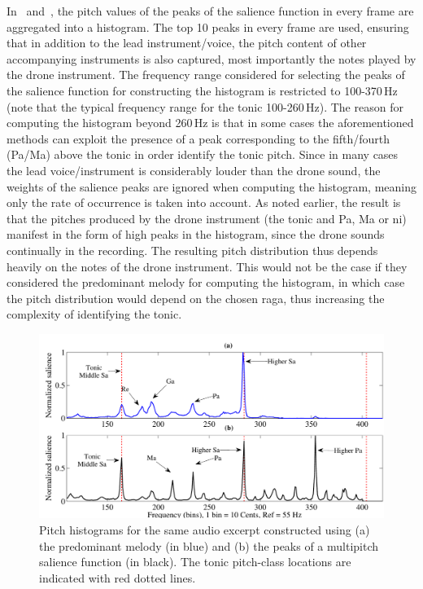 In~\cite{salamon2012multipitch} and~\cite{gulati2012two}, the pitch values of the peaks of the salience function in every frame are aggregated into a histogram. The top 10 peaks in every frame are used, ensuring that in addition to the lead instrument/voice, the pitch content of other accompanying instruments is also captured, most importantly the notes played by the drone instrument. The frequency range considered for selecting the peaks of the salience function for constructing the histogram is restricted to 100-370\,Hz (note that the typical frequency range for the tonic 100-260\,Hz). The reason for computing the histogram beyond 260\,Hz is that in some cases the aforementioned methods can exploit the presence of a peak corresponding to the fifth/fourth (Pa/Ma) above the tonic in order identify the tonic pitch. Since in many cases the lead voice/instrument is considerably louder than the drone sound, the weights of the salience peaks are ignored when computing the histogram, meaning only the rate of occurrence is taken into account. As noted earlier, the result is that the pitches produced by the drone instrument (the tonic and Pa, Ma or \gls{ni}) manifest in the form of high peaks in the histogram, since the drone sounds continually in the recording. The resulting pitch distribution thus depends heavily on the notes of the drone instrument. This would not be the case if they considered the predominant melody for computing the histogram, in which case the pitch distribution would depend on the chosen \gls{raga}, thus increasing the complexity of identifying the tonic.

\begin{figure}
	\begin{center}
		\includegraphics[width=\figSizeHundred]{ch02_background/figures/Histogram_Melody_Multipitch.pdf}
	\end{center}
	\caption[Pitch histograms constructed using two different methods]{Pitch histograms for the same audio excerpt constructed using (a) the predominant melody (in blue) and (b) the peaks of a multipitch salience function (in black). The tonic pitch-class locations are indicated with red dotted lines.}
	\label{fig:background_pitch_histograms_multipitch}
\end{figure}


